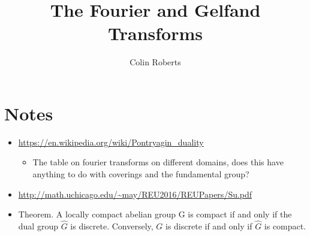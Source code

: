 \documentclass[12pt]{article}
\title{The Fourier and Gelfand Transforms}
\author{Colin Roberts}
\theoremstyle{definition}
\begin{document}
\maketitle


\setcounter{section}{-1}
\section{Notes}

\begin{itemize}
    \item \url{https://en.wikipedia.org/wiki/Pontryagin_duality}
    \begin{itemize}
        \item The table on fourier transforms on different domains, does this have anything to do with coverings and the fundamental group?
    \end{itemize}
    \item \url{http://math.uchicago.edu/~may/REU2016/REUPapers/Su.pdf}
    \item Theorem. A locally compact abelian group G is compact if and only if the dual group ${\displaystyle {\widehat {G}}}$ is discrete. Conversely, $G$ is discrete if and only if ${\displaystyle {\widehat {G}}}$ is compact.
\end{itemize}
\end{document}
